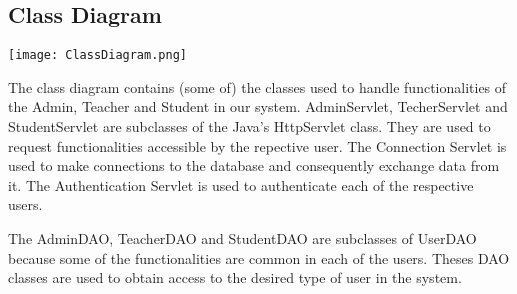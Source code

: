 \subsection{Class Diagram}

\texttt{[image: ClassDiagram.png]}

The class diagram contains (some of) the classes used to handle functionalities of the Admin, Teacher and Student in our system. 
AdminServlet, TecherServlet and StudentServlet are subclasses of the Java's HttpServlet class. They are used to 
request functionalities accessible by the repective user. The Connection Servlet is used to make connections 
to the database and consequently exchange data from it. The Authentication Servlet is used 
to authenticate each of the respective users. 


The AdminDAO, TeacherDAO and StudentDAO are subclasses of UserDAO because some of the 
functionalities are common in each of the users. Theses DAO classes are used to obtain 
access to the desired type of user in the system.